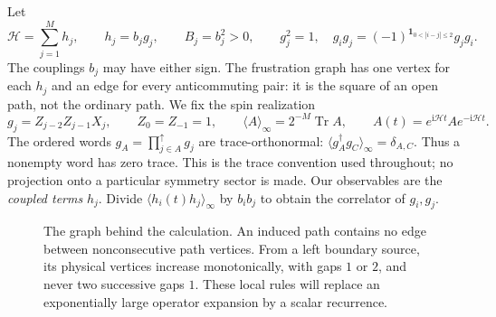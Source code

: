 \documentclass[11pt,a4paper]{article}
\newcommand{\ii}{\mathrm i}
\newcommand{\tr}{\operatorname{Tr}}
\newcommand{\av}[1]{\langle #1\rangle_\infty}
\newcommand{\HH}{\mathcal H}
\begin{document}
Let
\begin{equation}
\HH=\sum_{j=1}^{M}h_j,\qquad h_j=b_jg_j,\qquad B_j=b_j^2>0,
\qquad
 g_j^2=1,\quad
 g_ig_j=(-1)^{\mathbf1_{0<|i-j|\le2}}g_jg_i.
\label{eq:model}
\end{equation}
The couplings $b_j$ may have either sign. The frustration graph has one vertex for each $h_j$ and an edge for every anticommuting pair: it is the square of an open path, not the ordinary path. We fix the spin realization
\begin{equation}
 g_j=Z_{j-2}Z_{j-1}X_j,\qquad Z_0=Z_{-1}=1,
 \qquad
 \av{A}=2^{-M}\tr A,\qquad A(t)=e^{\ii\HH t}Ae^{-\ii\HH t}.
 \label{eq:rep}
\end{equation}
The ordered words $g_A=\prod_{j\in A}^{\uparrow}g_j$ are trace-orthonormal:
$\av{g_A^\dagger g_C}=\delta_{A,C}$. Thus a nonempty word has zero trace. This is the trace convention used throughout; no projection onto a particular symmetry sector is made. Our observables are the \emph{coupled terms} $h_j$. Divide $\av{h_i(t)h_j}$ by $b_ib_j$ to obtain the correlator of $g_i,g_j$.

\begin{figure}[t]
\centering
{}
\caption{The graph behind the calculation. An induced path contains no edge between nonconsecutive path vertices. From a left boundary source, its physical vertices increase monotonically, with gaps $1$ or $2$, and never two successive gaps $1$. These local rules will replace an exponentially large operator expansion by a scalar recurrence.}
\label{fig:graph}
\end{figure}
\end{document}
